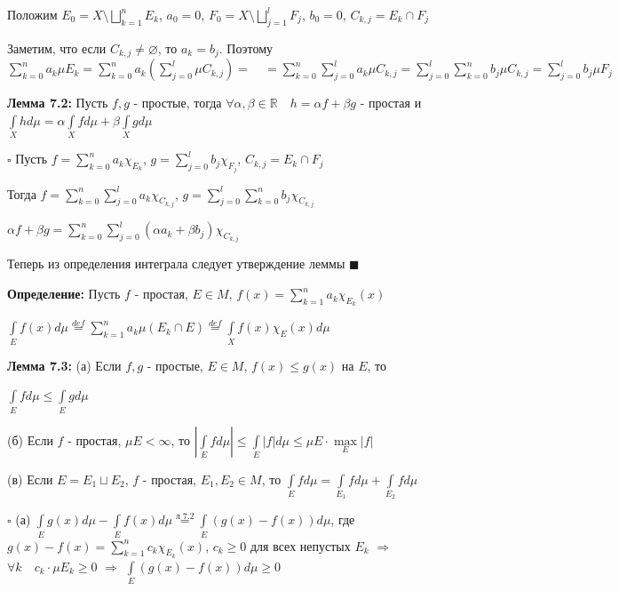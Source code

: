 \documentclass[a4paper]{report}
\begin{document}
Положим $E_0=X\setminus\bigsqcup\limits_{k=1}^n E_k$, $a_0=0$, $F_0=X\setminus\bigsqcup\limits_{j=1}^l F_j$, $b_0=0$, $C_{k,j}=E_k\cap F_j$

Заметим, что если $C_{k,j}\ne\varnothing$, то $a_k=b_j$. Поэтому $\sum\limits_{k=0}^n a_k\mu E_k=\sum\limits_{k=0}^n a_k\left(\sum\limits_{j=0}^l\mu C_{k,j}\right)=
\quad=\sum\limits_{k=0}^n\sum\limits_{j=0}^l a_k\mu C_{k,j}=\sum\limits_{j=0}^l\sum\limits_{k=0}^n b_j\mu C_{k,j}=\sum\limits_{j=0}^l b_j\mu F_j$
\bigskip

\noindent\textbf{Лемма 7.2:} Пусть $f,g$ - простые, тогда $\forall\alpha,\beta\in\mathbb R\quad h=\alpha f+\beta g$ - простая и $\displaystyle\int\limits_X hd\mu=\alpha
\displaystyle\int\limits_X fd\mu+\beta\displaystyle\int\limits_X gd\mu$

\noindent $\square$ Пусть $f=\sum\limits_{k=0}^n a_k\chi_{E_k}$, $g=\sum\limits_{j=0}^l b_j\chi_{F_j}$, $C_{k,j}=E_k\cap F_j$

Тогда $f=\sum\limits_{k=0}^n\sum\limits_{j=0}^l a_k\chi_{C_{k,j}}$, $g=\sum\limits_{j=0}^l\sum\limits_{k=0}^n b_j\chi_{C_{k,j}}$

$\alpha f+\beta g=\sum\limits_{k=0}^n\sum\limits_{j=0}^l(\alpha a_k+\beta b_j)\chi_{C_{k,j}}$

Теперь из определения интеграла следует утверждение леммы $\blacksquare$
\bigskip
\bigskip

\noindent\textbf{Определение:} Пусть $f$ - простая, $E\in M$, $f(x)=\sum\limits_{k=1}^n a_k\chi_{E_k}(x)$

$\displaystyle\int\limits_E f(x)d\mu\stackrel{def}{=}\sum\limits_{k=1}^n a_k\mu(E_k\cap E)\stackrel{def}{=}\displaystyle\int\limits_X f(x)\chi_E(x)d\mu$
\bigskip

\noindent\textbf{Лемма 7.3:} (а) Если $f,g$ - простые, $E\in M$, $f(x)\le g(x)$ на $E$, то

 $\displaystyle\int\limits_E fd\mu\le\displaystyle\int\limits_E gd\mu$

(б) Если $f$ - простая, $\mu E<\infty$, то $|\displaystyle\int\limits_E fd\mu|\le\displaystyle\int\limits_E|f|d\mu\le\mu E\cdot\max\limits_E|f|$

(в) Если $E=E_1\sqcup E_2$, $f$ - простая, $E_1,E_2\in M$, то $\displaystyle\int\limits_E fd\mu=\displaystyle\int\limits_{E_1}fd\mu+\displaystyle\int\limits_{E_2}fd\mu$

\noindent $\square$ (а) $\displaystyle\int\limits_E g(x)d\mu-\displaystyle\int\limits_E f(x)d\mu\stackrel{\text{л }7.2}{=}\displaystyle\int\limits_E(g(x)-f(x))d\mu$, где $g(x)-f(x)=\sum\limits_{k=1}^n
c_k\chi_{E_k}(x)$, $c_k\ge0$ для всех непустых $E_k$ $\Rightarrow$ $\forall k\quad c_k\cdot\mu E_k\ge0$ $\Rightarrow$ $\displaystyle\int\limits_E(g(x)-f(x))d\mu\ge0$
\end{document}
